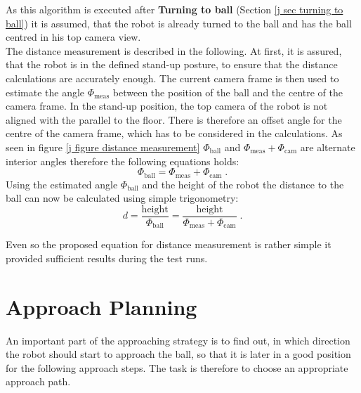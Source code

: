 As this algorithm is executed after \textbf{Turning to ball} (Section \ref{j sec turning to ball}) it is assumed, that the robot is already turned to the ball and has the ball centred in his top camera view. \\
The distance measurement is described in the following. At first, it is assured, that the robot is in the defined stand-up posture, to ensure that the distance calculations are accurately enough. The current camera frame is then used to estimate the angle $ \Phi_{\mathrm{meas}} $ between the position of the ball and the centre of the camera frame. In the stand-up position, the top camera of the robot is not aligned with the parallel to the floor. There is therefore an offset angle for the centre of the camera frame, which has to be considered in the calculations. As seen in figure \ref{j figure distance measurement} $ \Phi_{\mathrm{ball}} $ and $ \Phi_{\mathrm{meas}}+\Phi_{\mathrm{cam}} $ are alternate interior angles therefore the following equations holds: 
\begin{equation}
	\Phi_{\mathrm{ball}} = \Phi_{\mathrm{meas}}+\Phi_{\mathrm{cam}} \; .
\end{equation}
Using the estimated angle $ \Phi_{\mathrm{ball}} $ and the height of the robot the distance to the ball can now be calculated using simple trigonometry: 
\begin{equation}
	d = \frac{\mathrm{height}}{\Phi_{\mathrm{ball}}} = \frac{\mathrm{height}}{\Phi_{\mathrm{meas}}+\Phi_{\mathrm{cam}}} \; .
\end{equation}

Even so the proposed equation for distance measurement is rather simple it provided sufficient results during the test runs. 

\section{Approach Planning}
\label{j sec approach planing}
An important part of the approaching strategy is to find out, in which direction the robot should start to approach the ball, so that it is later in a good position for the following approach steps. 
The task is therefore to choose an appropriate approach path.


